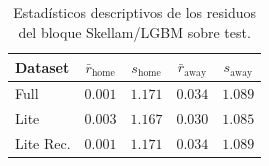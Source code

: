 \begin{table}[htbp]
    \centering
    \caption{Estad\'isticos descriptivos de los residuos del bloque Skellam/LGBM sobre test.}
    \label{tab:skellam_resid}
    \begin{tabular}{lcccc}
        \toprule
        \textbf{Dataset} & $\bar{r}_{\text{home}}$ & $s_{\text{home}}$ & $\bar{r}_{\text{away}}$ & $s_{\text{away}}$ \\
        \midrule
        Full & $0.001$ & $1.171$ & $0.034$ & $1.089$ \\
        Lite & $0.003$ & $1.167$ & $0.030$ & $1.085$ \\
        Lite Rec. & $0.001$ & $1.171$ & $0.034$ & $1.089$ \\
        \bottomrule
    \end{tabular}
\end{table}